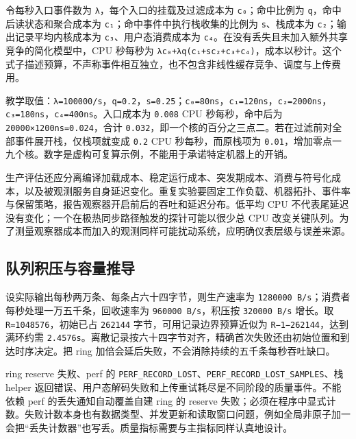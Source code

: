 \documentclass[UTF8,fontset=fandol,openany,11pt]{ctexbook}
\begin{document}
令每秒入口事件数为 \texttt{λ}，每个入口的挂载及过滤成本为 \texttt{c₀}；命中比例为 \texttt{q}，命中后读状态和聚合成本为 \texttt{c₁}；命中事件中执行栈收集的比例为 \texttt{s}、栈成本为 \texttt{c₂}；输出记录平均内核成本为 \texttt{c₃}、用户态消费成本为 \texttt{c₄}。在没有丢失且未加入额外共享竞争的简化模型中，CPU 秒每秒为 \texttt{λc₀+λq(c₁+sc₂+c₃+c₄)}，成本以秒计。这个式子描述预算，不声称事件相互独立，也不包含非线性缓存竞争、调度与上传费用。\cite{eb-map-array-code}\cite{eb-ring-code}\cite{eb-ring-consume}


教学取值：\texttt{λ=100000/\allowbreak{}s}，\texttt{q=0.\allowbreak{}2}，\texttt{s=0.\allowbreak{}25}；\texttt{c₀=80ns}，\texttt{c₁=120ns}，\texttt{c₂=2000ns}，\texttt{c₃=180ns}，\texttt{c₄=400ns}。入口成本为 \texttt{0.\allowbreak{}008} CPU 秒每秒，命中后为 \texttt{20000×1200ns=0.\allowbreak{}024}，合计 \texttt{0.\allowbreak{}032}，即一个核的百分之三点二。若在过滤前对全部事件展开栈，仅栈项就变成 \texttt{0.\allowbreak{}2} CPU 秒每秒，而原栈项为 \texttt{0.\allowbreak{}01}，增加零点一九个核。数字是虚构可复算示例，不能用于承诺特定机器上的开销。\cite{eb-stackmap}\cite{eb-ring-code}


生产评估还应分离编译加载成本、稳定运行成本、突发期成本、消费与符号化成本，以及被观测服务自身延迟变化。重复实验要固定工作负载、机器拓扑、事件率与保留策略，报告观察器开启前后的吞吐和延迟分布。低平均 CPU 不代表尾延迟没有变化；一个在极热同步路径触发的探针可能以很少总 CPU 改变关键队列。为了测量观察器成本而加入的观测同样可能扰动系统，应明确仪表层级与误差来源。\cite{eb-uprobe}\cite{eb-ring-code}\cite{eb-perf-core}


\subsection{队列积压与容量推导}

设实际输出每秒两万条、每条占六十四字节，则生产速率为 \texttt{1280000 B/\allowbreak{}s}；消费者每秒处理一万五千条，回收速率为 \texttt{960000 B/\allowbreak{}s}，积压按 \texttt{320000 B/\allowbreak{}s} 增长。取 \texttt{R=1048576}，初始已占 \texttt{262144} 字节，可用记录边界预算近似为 \texttt{R−1−262144}，达到满环约需 \texttt{2.\allowbreak{}4576s}。离散记录按六十四字节对齐，精确首次失败还由初始位置和到达时序决定。把 ring 加倍会延后失败，不会消除持续的五千条每秒吞吐缺口。\cite{eb-ring-code}\cite{eb-ring-consume}


ring reserve 失败、perf 的 \texttt{PERF\_\allowbreak{}RECORD\_\allowbreak{}LOST}、\texttt{PERF\_\allowbreak{}RECORD\_\allowbreak{}LOST\_\allowbreak{}SAMPLES}、栈 helper 返回错误、用户态解码失败和上传重试耗尽是不同阶段的质量事件。不能依赖 perf 的丢失通知自动覆盖自建 ring 的 reserve 失败；必须在程序中显式计数。失败计数本身也有数据类型、并发更新和读取窗口问题，例如全局非原子加一会把“丢失计数器”也写丢。质量指标需要与主指标同样认真地设计。\cite{eb-perf-abi}\cite{eb-ring-code}\cite{eb-map-array-doc}
\end{document}
